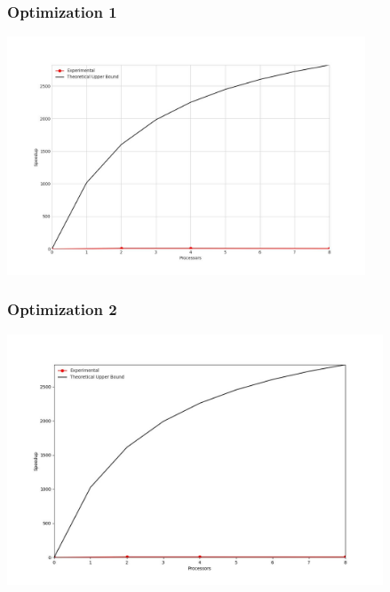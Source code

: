 \subsubsection{Optimization 1}
\begin{center}
    \resizebox{0.95\textwidth}{!}{}
    \includegraphics[width=0.8\textwidth]{../img/speedup-graph_type-random-500000-O1}
\end{center}

\clearpage
\subsubsection{Optimization 2}
\begin{center}
    \resizebox{0.95\textwidth}{!}{}
    \includegraphics[width=0.84\textwidth]{../img/speedup-graph_type-random-500000-O2}
\end{center}

